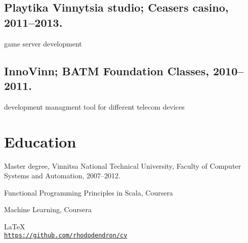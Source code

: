 \documentclass[letterpaper]{article}
\def\footerlink{https://github.com/rhododendron/cv}
\renewenvironment{itemize}{
  \begin{list}{}{
    \setlength{\leftmargin}{1.5em}
  }
}{
  \end{list}
}
\begin{document}
\subsection*{Playtika Vinnytsia studio; Ceasers casino, 2011--2013.}

\begin{itemize}
\item game server development
\end{itemize}

\subsection*{InnoVinn; BATM Foundation Classes, 2010--2011.}

\begin{itemize}
\item development managment tool for different telecom devices  
\end{itemize}

\section*{Education}

\begin{itemize}
  \item Master degree, Vinnitsa National Technical University, Faculty of Computer 
Systems and Automation, 2007--2012.
  \item Functional Programming Principles in Scala, Coursera
  \item Machine Learning, Coursera
\end{itemize}

\bigskip

\begin{center}
  \begin{footnotesize}
    \LaTeX \\
    \href{\footerlink}{\texttt{\footerlink}}
  \end{footnotesize}
\end{center}
\end{document}
